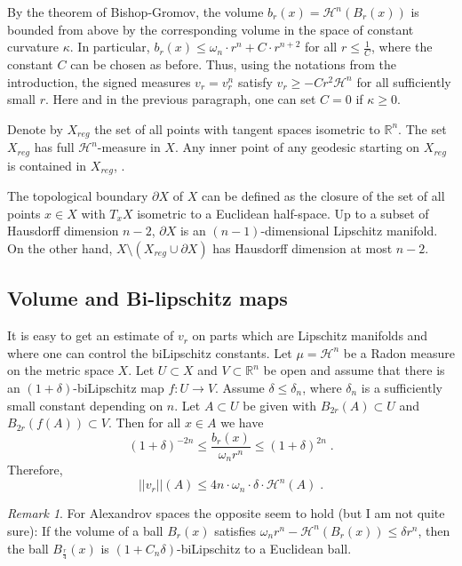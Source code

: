 \documentclass[12pt,leqno]{amsart}
\numberwithin{equation}{section}
\theoremstyle{definition}
\theoremstyle{remark}
\newtheorem{rem}[thm]{Remark}
\newcommand{\R}{\mathbb{R}}
\begin{document}
By the theorem of Bishop-Gromov, the volume $b_r (x)=\mathcal H^n (B_r(x))$ is bounded from above by the corresponding volume in the
space of constant curvature $\kappa$. In particular, $b_r (x) \leq \omega _n \cdot r^n + C \cdot r^{n+2}$ for all $r\leq \frac 1 C$, where
the constant $C$ can be chosen as before.  Thus, using the notations from the introduction, the signed measures $v_r  =v_r^n $ satisfy
$v_r \geq -Cr^2 \mathcal H^n$  for all sufficiently small $r$.
 Here and in the previous paragraph,  one can set $C=0$ if $\kappa \geq 0$.


Denote by $X_{reg}$ the set of all points with tangent spaces isometric to $\R^n$.  The set $X_{reg}$ has full $\mathcal H^n$-measure in $X$.
Any inner point of any geodesic starting on $X_{reg}$ is contained in $X_{reg}$, \cite{Petparallel}.


The topological boundary $\partial X$ of $X$ can be defined as the closure of the  set of all points $x\in X$ with $T_xX$ isometric to a Euclidean half-space. Up to a subset of Hausdorff dimension $n-2$, $\partial X$ is an $(n-1)$-dimensional Lipschitz manifold. On the other hand, $X\setminus (X_{reg} \cup \partial X)$ has Hausdorff dimension at most $n-2$.


\subsection{Volume and Bi-lipschitz maps}
It is easy to get an estimate of $v_r$  on parts which are Lipschitz manifolds and where one can control the biLipschitz constants.
Let $\mu =\mathcal H^n$ be a Radon measure on the metric space $X$.
Let $U\subset X$ and $V\subset \R^n$ be open and assume that there is an $(1+\delta)$-biLipschitz map
$f:U \to V$.  Assume $\delta  \leq \delta _n$, where $\delta_n$ is a sufficiently small constant depending on $n$.
 Let $A\subset U$ be given with
$B_{2r} (A) \subset U$ and $B_{2r} (f(A)) \subset V$.  Then for all $x\in A$ we have
$$(1+\delta)  ^{-2n} \leq \frac {b_r(x)} {\omega _n r^n} \leq (1+\delta ) ^{2n} \; .$$
Therefore,
$$||v_r || (A) \leq  4 n \cdot \omega _n \cdot  \delta \cdot \mathcal H^n (A)  \; .$$
\begin{rem} For Alexandrov  spaces the opposite seem to hold (but I am not quite sure):
If the volume of  a ball $B_r (x)$ satisfies $\omega _n r^n -\mathcal H^n (B_r (x)) \leq \delta r ^n$, then
the ball $B_{\frac r 4} (x)$ is  $(1+C_n \delta )$-biLipschitz  to a Euclidean ball.
\end{rem}
\end{document}
